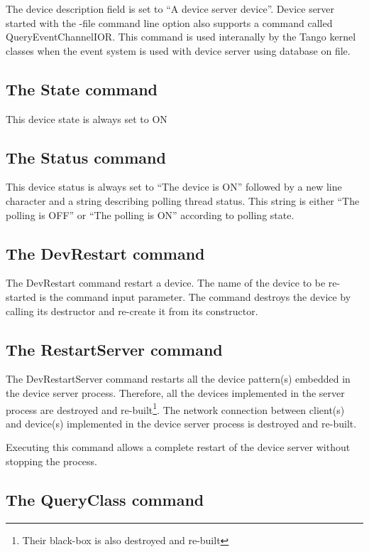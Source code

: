 \vspace{0.3cm}

The device description field is set to ``A device server device''.
Device server started with the -file command line option also supports
a command called QueryEventChannelIOR.
This command is used interanally by the Tango kernel classes when
the event system is used with device server using database on file.

\subsection{The State command}

This device state is always set to ON

\subsection{The Status command}

This device status is always set to ``The device is ON'' followed
by a new line character and a string describing polling thread status.
This string is either ``The polling is OFF'' or ``The polling is
ON'' according to polling state.

\subsection{The DevRestart command}

The DevRestart command restart a device. The name of the device to
be re-started is the command input parameter. The command destroys
the device by calling its destructor and re-create it from its constructor.

\subsection{The RestartServer command}

The DevRestartServer command restarts all the device pattern(s) embedded
in the device server process. Therefore, all the devices implemented
in the server process are destroyed and re-built\footnote{Their black-box is also destroyed and re-built}.
The network connection between client(s) and device(s) implemented
in the device server process is destroyed and re-built. 

Executing this command allows a complete restart of the device server
without stopping the process.

\subsection{The QueryClass command}

